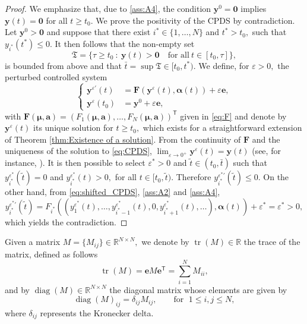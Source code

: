\documentclass[10pt]{article}
\theoremstyle{remark}
\newcommand{\tpose}{^\mathsf{T}}
\theoremstyle{definition}
\theoremstyle{remark}
\DeclareMathOperator{\diag}{diag}
\DeclareMathOperator{\tr}{tr}
\begin{document}
\begin{proof}
    We emphasize that, due to \ref{ass:A4}, the condition $\bm{y}^0=\bm{0}$ implies  $\bm{y}(t)=\bm{0}$ for all $t\geq t_0.$ We prove the positivity of the CPDS by contradiction. Let $\bm{y}^0>\bm{0}$ and suppose that there exist $i^*\in \{1,\dots,N\}$ and $t^*>t_0,$ such that $y_{i^*}(t^*)\leq 0.$ It then follows that the non-empty set 
    \begin{equation*}
        \mathfrak{T}=\{\tau \geq t_0 \ : \ \bm{y}(t)>\bm{0} \quad \mbox{for all} \ t\in [t_0,\tau] \},
    \end{equation*}
    is bounded from above and that $\bar{t}=\sup \mathfrak{T}\in [t_0,t^*).$ We define, for $\varepsilon >0,$ the perturbed controlled system 
    \begin{equation}\label{eq:shifted_CPDS}
    \left\{
    \begin{aligned}
        \bm{y}^{\varepsilon \prime}(t)&=\bm{F}(\bm{y}^{\varepsilon}(t),\bm{\alpha}(t)) + \varepsilon \bm{e}, \\
        \bm{y}^{\varepsilon}(t_0)&=\bm{y}^0+ \varepsilon \bm{e},
    \end{aligned}
    \right.
    \end{equation}
    with $\bm{F}(\bm{\mu},\bm{a})=(F_1(\bm{\mu},\bm{a}),\dots,F_N(\bm{\mu},\bm{a}))\tpose$ given in \eqref{eq:F} and denote by $\bm{y}^{\varepsilon}(t)$ its unique solution for $t\geq t_0,$ which exists for a straightforward extension of Theorem \ref{thm:Existence of a solution}. From the continuity of $\bm{F}$ and the uniqueness of the solution to \eqref{eq:CPDS}, $\lim_{\varepsilon \to 0^+}\bm{y}^{\varepsilon}(t)=\bm{y}(t)$ (see, for instance, \cite[p. 18]{coppel1965stability}). It is then possible to select $\varepsilon^*>0$ and $\tilde{t}\in (t_0,\bar{t})$ such that ${y}^{\varepsilon^*}_{i^*}(\tilde{t})=0$ and ${y}^{\varepsilon^*}_{i^*}(t)>0,$ for all $t\in [t_0,\tilde{t}).$ Therefore ${y}^{\varepsilon^* \prime}_{i^*}(\tilde{t})\leq 0.$ On the other hand, from \eqref{eq:shifted_CPDS}, \ref{ass:A2} and \ref{ass:A4}, 
    \begin{equation*}
        {y}^{\varepsilon^* \prime}_{i^*}(\tilde{t})= F_{i^*}(({y}^{\varepsilon^*}_1(t),\dots, y^{\varepsilon^*}_{i^*-1}(t),0,y^{\varepsilon^*}_{i^*+1}(t),\dots),\bm{\alpha}(t)) + \varepsilon^* = \varepsilon^* >0,
    \end{equation*}
    which yields the contradiction.
\end{proof}

Given a matrix $M=\{M_{ij}\}\in \mathbb{R}^{N \times N},$ we denote by $\tr(M)\in \mathbb{R}$ the trace of the matrix, defined as follows
\begin{equation*}
    \tr(M)=\bm{e}M\bm{e}\tpose=\textstyle\sum_{i=1}^NM_{ii},
\end{equation*}
and by $\diag(M)\in \mathbb{R}^{N \times N}$ the diagonal matrix whose elements are given by
\begin{equation}\label{eq:diag}
    \diag(M)_{ij}=\delta_{ij}M_{ij}, \qquad \mbox{for  } \; 1\leq i,j \leq N,
\end{equation}
where $\delta_{ij}$ represents the Kronecker delta. 
\end{document}
